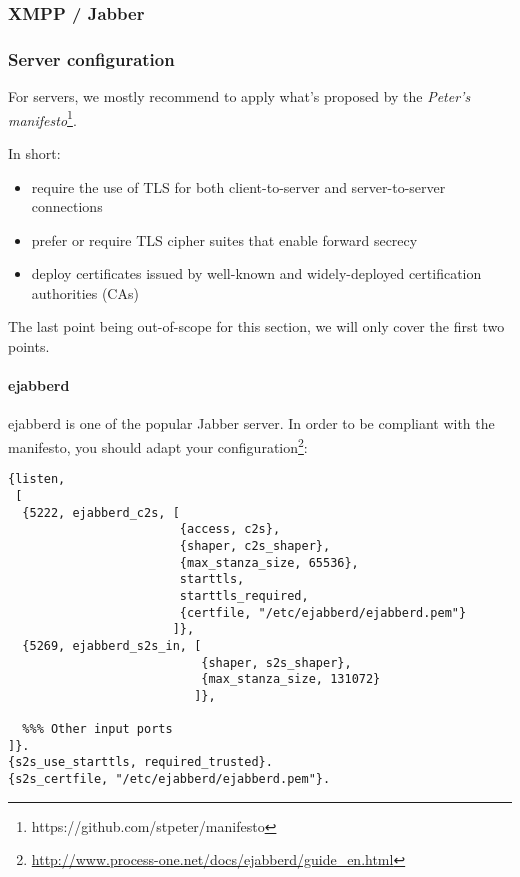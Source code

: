 \subsubsection{XMPP / Jabber}

\subsubsection{Server configuration}

For servers, we mostly recommend to apply what's proposed by the {\it Peter's manifesto}\footnote{https://github.com/stpeter/manifesto}.

In short:
\begin{itemize}
    \item require the use of TLS for both client-to-server and server-to-server connections
    \item prefer or require TLS cipher suites that enable forward secrecy
    \item deploy certificates issued by well-known and widely-deployed certification authorities (CAs)
\end{itemize}

The last point being out-of-scope for this section, we will only cover the first two points.

\paragraph{ejabberd}

ejabberd is one of the popular Jabber server.  In order to be compliant
with the manifesto, you should adapt your
configuration\footnote{\url{http://www.process-one.net/docs/ejabberd/guide_en.html}}:
\begin{lstlisting}[breaklines]
{listen,
 [
  {5222, ejabberd_c2s, [
                        {access, c2s},
                        {shaper, c2s_shaper},
                        {max_stanza_size, 65536},
                        starttls,
                        starttls_required, 
                        {certfile, "/etc/ejabberd/ejabberd.pem"}
                       ]},
  {5269, ejabberd_s2s_in, [
                           {shaper, s2s_shaper},
                           {max_stanza_size, 131072}
                          ]},

  %%% Other input ports
]}.
{s2s_use_starttls, required_trusted}.
{s2s_certfile, "/etc/ejabberd/ejabberd.pem"}.
\end{lstlisting}


